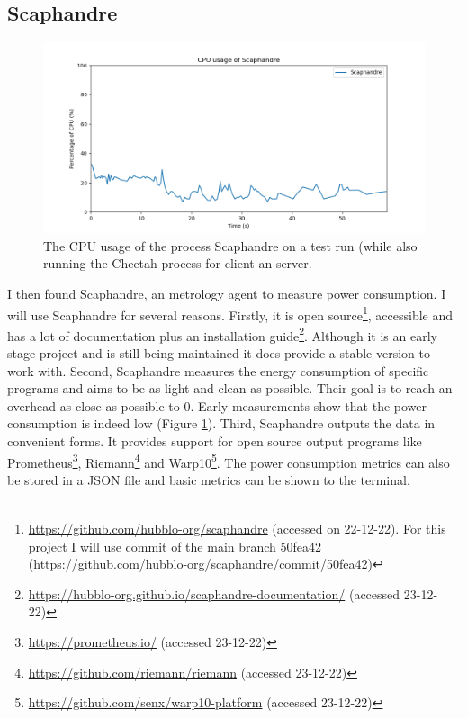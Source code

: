 \documentclass[../thesis.tex]{subfiles}
\begin{document}
\subsection{Scaphandre}
\begin{figure}
    \centering
    \includegraphics[width=\linewidth]{Thesis/Images/overhead_scaphandre.png}
    \caption{The CPU usage of the process Scaphandre on a test run (while also running the Cheetah process for client an server.}
    \label{fig:overhead_scaphandre}
\end{figure}
I then found Scaphandre, an metrology agent to measure power consumption. I will use Scaphandre for several reasons. Firstly, it is open source\footnote{\url{https://github.com/hubblo-org/scaphandre} (accessed on 22-12-22). For this project I will use commit of the main branch 50fea42 (\url{https://github.com/hubblo-org/scaphandre/commit/50fea42})}, accessible and has a lot of documentation plus an installation guide\footnote{\url{https://hubblo-org.github.io/scaphandre-documentation/} (accessed 23-12-22)}. Although it is an early stage project and is still being maintained it does provide a stable version to work with. Second, Scaphandre measures the energy consumption of specific programs and aims to be as light and clean as possible. Their goal is to reach an overhead as close as possible to 0. Early measurements show that the power consumption is indeed low (Figure \ref{fig:overhead_scaphandre}). Third, Scaphandre outputs the data in convenient forms. It provides support for open source output programs like Prometheus\footnote{\url{https://prometheus.io/} (accessed 23-12-22)}, Riemann\footnote{\url{https://github.com/riemann/riemann} (accessed 23-12-22)} and Warp10\footnote{\url{https://github.com/senx/warp10-platform} (accessed 23-12-22)}. The power consumption metrics can also be stored in a JSON file and basic metrics can be shown to the terminal. \paragraph{}
\end{document}
